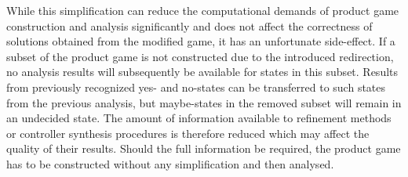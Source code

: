     While this simplification can reduce the computational demands of product game construction and analysis significantly and does not affect the correctness of solutions obtained from the modified game, it has an unfortunate side-effect.
    If a subset of the product game is not constructed due to the introduced redirection, no analysis results will subsequently be available for states in this subset.
    Results from previously recognized yes- and no-states can be transferred to such states from the previous analysis, but maybe-states in the removed subset will remain in an undecided state.
    The amount of information available to refinement methods or controller synthesis procedures is therefore reduced which may affect the quality of their results.
    Should the full information be required, the product game has to be constructed without any simplification and then analysed.

\stopsubsection

